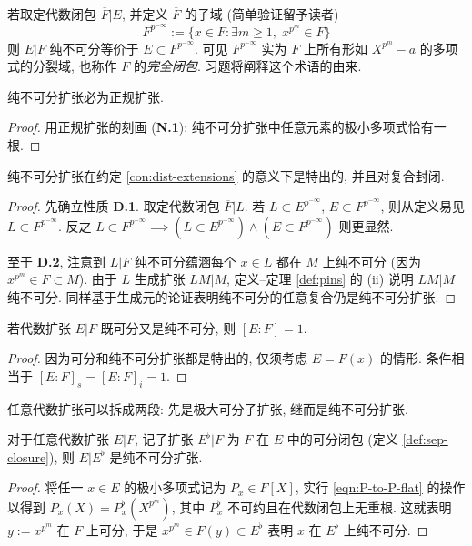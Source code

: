 若取定代数闭包 $\overline{F}|E$, 并定义 $\overline{F}$ 的子域 (简单验证留予读者)
\[ F^{p^{-\infty}} := \{ x \in \overline{F}: \exists m \geq 1,\; x^{p^m} \in F \}  \]
则 $E|F$ 纯不可分等价于 $E \subset F^{p^{-\infty}}$. 可见 $F^{p^{-\infty}}$ 实为 $F$ 上所有形如 $X^{p^m}-a$ 的多项式的分裂域, 也称作 $F$ 的\emph{完全闭包}. 习题将阐释这个术语的由来.

\begin{lemma}
	纯不可分扩张必为正规扩张.
\end{lemma}
\begin{proof}
	用正规扩张的刻画 (\textbf{N.1}): 纯不可分扩张中任意元素的极小多项式恰有一根.
\end{proof}

\begin{proposition}\label{prop:pins-dist}
	纯不可分扩张在约定 \ref{con:dist-extensions} 的意义下是特出的, 并且对复合封闭.
\end{proposition}
\begin{proof}
	先确立性质 \textbf{D.1}. 取定代数闭包 $\overline{F}|L$. 若 $L \subset E^{p^{-\infty}}$, $E \subset F^{p^{-\infty}}$, 则从定义易见 $L \subset F^{p^{-\infty}}$. 反之 $L \subset F^{p^{-\infty}} \implies (L \subset E^{p^{-\infty}}) \wedge (E \subset F^{p^{-\infty}})$ 则更显然.

	至于 \textbf{D.2}, 注意到 $L|F$ 纯不可分蕴涵每个 $x \in L$ 都在 $M$ 上纯不可分 (因为 $x^{p^m} \in F \subset M$). 由于 $L$ 生成扩张 $LM|M$, 定义--定理 \ref{def:pins} 的 (ii) 说明 $LM|M$ 纯不可分. 同样基于生成元的论证表明纯不可分的任意复合仍是纯不可分扩张.
\end{proof}

\begin{lemma}\label{prop:pins-sep}
	若代数扩张 $E|F$ 既可分又是纯不可分, 则 $[E:F]=1$.
\end{lemma}
\begin{proof}
	因为可分和纯不可分扩张都是特出的, 仅须考虑 $E=F(x)$ 的情形. 条件相当于 $[E:F]_s = [E:F]_i = 1$.
\end{proof}

任意代数扩张可以拆成两段: 先是极大可分子扩张, 继而是纯不可分扩张.
\begin{proposition}\label{prop:pins-devissage}
	对于任意代数扩张 $E|F$, 记子扩张 $E^\flat|F$ 为 $F$ 在 $E$ 中的可分闭包 (定义 \ref{def:sep-closure}), 则 $E|E^\flat$ 是纯不可分扩张.
\end{proposition}
\begin{proof}
	将任一 $x \in E$ 的极小多项式记为 $P_x \in F[X]$, 实行 \eqref{eqn:P-to-P-flat} 的操作以得到 $P_x(X) = P_x^\flat\left( X^{p^m} \right)$, 其中 $P_x^\flat$ 不可约且在代数闭包上无重根. 这就表明 $y := x^{p^m}$ 在 $F$ 上可分, 于是 $x^{p^m} \in F(y) \subset E^\flat$ 表明 $x$ 在 $E^\flat$ 上纯不可分.
\end{proof}

